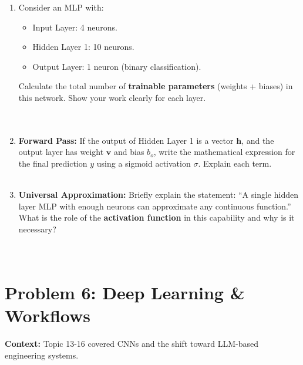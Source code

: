 \documentclass[12pt]{article}
\begin{document}
\begin{enumerate}[label=(\alph*)]
    \item Consider an MLP with:
    \begin{itemize}
        \item Input Layer: 4 neurons.
        \item Hidden Layer 1: 10 neurons.
        \item Output Layer: 1 neuron (binary classification).
    \end{itemize}
    Calculate the total number of \textbf{trainable parameters} (weights + biases) in this network. Show your work clearly for each layer. \\
    \fullunderline \\
    \fullunderline \\
    \fullunderline

    \item \textbf{Forward Pass:} If the output of Hidden Layer 1 is a vector $\bm{h}$, and the output layer has weight $\bm{v}$ and bias $b_o$, write the mathematical expression for the final prediction $y$ using a sigmoid activation $\sigma$. Explain each term. \\
    \fullunderline \\
    \fullunderline

    \item \textbf{Universal Approximation:} Briefly explain the statement: ``A single hidden layer MLP with enough neurons can approximate any continuous function.'' What is the role of the \textbf{activation function} in this capability and why is it necessary? \\
    \fullunderline \\
    \fullunderline \\
    \fullunderline
\end{enumerate}

\section{Problem 6: Deep Learning \& Workflows}
\textbf{Context:} Topic 13-16 covered CNNs and the shift toward LLM-based engineering systems.
\end{document}
